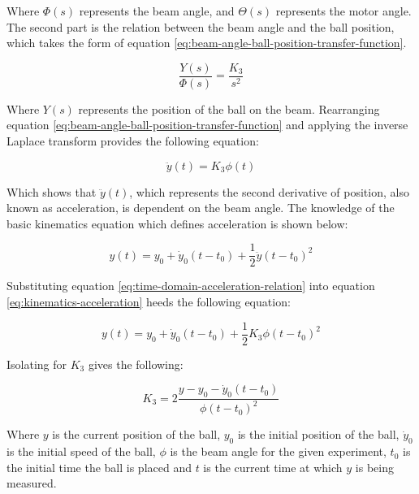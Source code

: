 \documentclass[11pt, letterpaper]{article}
\begin{document}
Where $\Phi(s)$ represents the beam angle, and $\Theta(s)$ represents the motor angle. The second
part is the relation between the beam angle and the ball position, which takes the form
of equation \ref{eq:beam-angle-ball-position-transfer-function}.

\begin{equation}
    \label{eq:beam-angle-ball-position-transfer-function}
    \frac{Y(s)}{\Phi (s)} = \frac{K_3}{s^2}
\end{equation}

Where $Y(s)$ represents the position of the ball on the beam.
Rearranging equation \ref{eq:beam-angle-ball-position-transfer-function} and applying the
inverse Laplace transform provides the following equation:

\begin{equation}
    \label{eq:time-domain-acceleration-relation}
    \ddot{y}(t) = K_3 \phi (t)
\end{equation}

Which shows that $\ddot{y}(t)$, which represents the second derivative of position, also known
as acceleration, is dependent on the beam angle. The knowledge of the basic kinematics
equation which defines acceleration is shown below:

\begin{equation}
    \label{eq:kinematics-acceleration}
    y(t) = y_0 + \dot{y}_0 (t-t_0) + \frac{1}{2} \ddot{y} (t - t_0)^2
\end{equation}

Substituting equation \ref{eq:time-domain-acceleration-relation} into equation \ref{eq:kinematics-acceleration}
heeds the following equation:

\begin{equation}
    y(t) = y_0 + \dot{y}_0 (t - t_0) + \frac{1}{2} K_3 \phi (t - t_0)^2
\end{equation}

Isolating for $K_3$ gives the following:

\begin{equation}
    \label{eq:k3-isolated}
    K_3 = 2 \frac{y - y_0 - \dot{y}_0 (t-t_0)}{\phi (t-t_0)^2}
\end{equation}

Where $y$ is the current position of the ball, $y_0$ is the initial position of the ball,
$\dot{y}_0$ is the initial speed of the ball, $\phi$ is the beam angle for the given
experiment, $t_0$ is the initial time the ball is placed
and $t$ is the current time at which $y$ is being measured. \par
\end{document}
